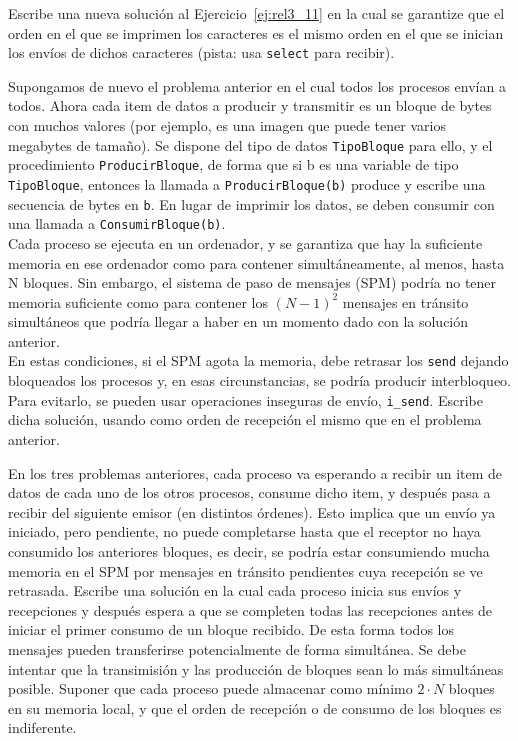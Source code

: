 \begin{ejercicio}\label{ej:rel3_12}
    Escribe una nueva solución al Ejercicio~\ref{ej:rel3_11} en la cual se garantize que el orden en el que se imprimen los caracteres es el mismo orden en el que se inician los envíos de dichos caracteres (pista: usa \verb|select| para recibir).
\end{ejercicio}

\begin{ejercicio}\label{ej:rel3_13}
    Supongamos de nuevo el problema anterior en el cual todos los procesos envían a todos. Ahora cada item de datos a producir y transmitir es un bloque de bytes con muchos valores (por ejemplo, es una imagen que puede tener varios megabytes de tamaño). Se dispone del tipo de datos \verb|TipoBloque| para ello, y el procedimiento \verb|ProducirBloque|, de forma que si b es una variable de tipo \verb|TipoBloque|, entonces la llamada a \verb|ProducirBloque(b)| produce y escribe una secuencia de bytes en \verb|b|. En lugar de imprimir los datos, se deben consumir con una llamada a \verb|ConsumirBloque(b)|.\\

    Cada proceso se ejecuta en un ordenador, y se garantiza que hay la suficiente memoria en ese ordenador como para contener simultáneamente, al menos, hasta N bloques. Sin embargo, el sistema de paso de mensajes (SPM) podría no tener memoria suficiente como para contener los ${(N-1)}^{2}$ mensajes en tránsito simultáneos que podría llegar a haber en un momento dado con la solución anterior.\\

    En estas condiciones, si el SPM agota la memoria, debe retrasar los \verb|send| dejando bloqueados los procesos y, en esas circunstancias, se podría producir interbloqueo. Para evitarlo, se pueden usar operaciones inseguras de envío, \verb|i_send|. Escribe dicha solución, usando como orden de recepción el mismo que en el problema anterior.
\end{ejercicio}

\begin{ejercicio}\label{ej:rel3_14}
    En los tres problemas anteriores, cada proceso va esperando a recibir un item de datos de cada uno de los otros procesos, consume dicho item, y después pasa a recibir del siguiente emisor (en distintos órdenes). Esto implica que un envío ya iniciado, pero pendiente, no puede completarse hasta que el receptor no haya consumido los anteriores bloques, es decir, se podría estar consumiendo mucha memoria en el SPM por mensajes en tránsito pendientes cuya recepción se ve retrasada. Escribe una solución en la cual cada proceso inicia sus envíos y recepciones y después espera a que se completen todas las recepciones antes de iniciar el primer consumo de un bloque recibido. De esta forma todos los mensajes pueden transferirse potencialmente de forma simultánea. Se debe intentar que la transimisión y las producción de bloques sean lo más simultáneas posible. Suponer que cada proceso puede almacenar como mínimo $2\cdot N$ bloques en su memoria local, y que el orden de recepción o de consumo de los bloques es indiferente.
\end{ejercicio}

